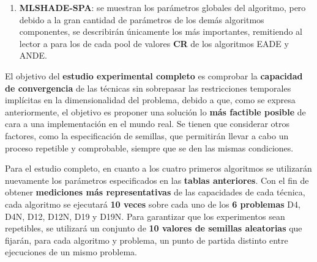 \begin{enumerate}
	
	\item \textbf{MLSHADE-SPA}: se muestran los parámetros globales del algoritmo, pero debido a la gran cantidad de parámetros de los demás algoritmos componentes, se describirán únicamente los más importantes, remitiendo al lector a \cite{EADE,ANDE} para los de cada pool de valores \textbf{CR} de los algoritmos EADE y ANDE.
	
	\begin{table}[H]
		\centering
		\caption{Parámetros de MLSHADE-SPA}\label{tabla:MLSHADESPArameters}
	\end{table}
	
	
\end{enumerate}

El objetivo del \textbf{estudio experimental completo} es comprobar la \textbf{capacidad de convergencia} de las técnicas sin sobrepasar las restricciones temporales implícitas en la dimensionalidad del problema, debido a que, como se expresa anteriormente, el objetivo es proponer una solución lo \textbf{más factible posible} de cara a una implementación en el mundo real. Se tienen que considerar otros factores, como la especificación de semillas, que permitirán llevar a cabo un proceso repetible y comprobable, siempre que se den las mismas condiciones.

Para el estudio completo, en cuanto a los cuatro primeros algoritmos se utilizarán nuevamente los parámetros especificados en las \textbf{tablas anteriores}. Con el fin de obtener \textbf{mediciones más representativas} de las capacidades de cada técnica, cada algoritmo se ejecutará \textbf{10 veces} sobre cada uno de los \textbf{6 problemas} D4, D4N, D12, D12N, D19 y D19N. Para garantizar que los experimentos sean repetibles, se utilizará un conjunto de \textbf{10 valores de semillas aleatorias} que fijarán, para cada algoritmo y problema, un punto de partida distinto entre ejecuciones de un mismo problema. 

